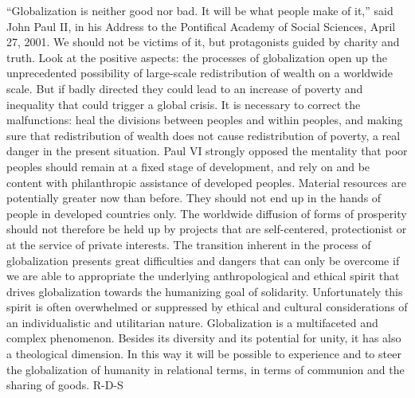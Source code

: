 \documentclass[oneside]{book}
\begin{document}
``Globalization is neither good nor bad. It will be what people make of it,''
said John Paul II, in his Address to the Pontifical Academy of Social Sciences,
April 27, 2001. We should not be victims of it, but protagonists guided by
charity and truth. Look at the positive aspects: the processes of globalization
open up the unprecedented possibility of large-scale redistribution of wealth on
a worldwide scale. But if badly directed they could lead to an increase of
poverty and inequality that could trigger a global crisis. It is necessary to
correct the malfunctions: heal the divisions between peoples and within peoples,
and making sure that redistribution of wealth does not cause redistribution of
poverty, a real danger in the present situation. Paul VI strongly opposed the
mentality that poor peoples should remain at a fixed stage of development, and
rely on and be content with philanthropic assistance of developed
peoples. Material resources are potentially greater now than before. They should
not end up in the hands of people in developed countries only.
The worldwide diffusion of forms of prosperity should not therefore be held up
by projects that are self-centered, protectionist or at the service of private
interests. The transition inherent in the process of globalization presents
great difficulties and dangers that can only be overcome if we are able to
appropriate the underlying anthropological and ethical spirit that drives
globalization towards the humanizing goal of solidarity. Unfortunately this
spirit is often overwhelmed or suppressed by ethical and cultural considerations
of an individualistic and utilitarian nature. Globalization is a multifaceted
and complex phenomenon. Besides its diversity and its potential for unity, it
has also a theological dimension. In this way it will be possible to experience
and to steer the globalization of humanity in relational terms, in terms of
communion and the sharing of goods.
R-D-S
\end{document}
